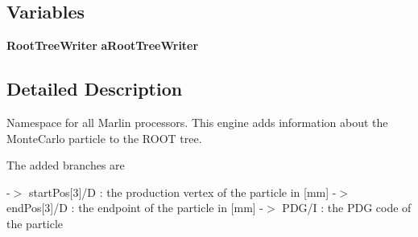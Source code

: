 \subsection*{Variables}
\begin{DoxyCompactItemize}
\item 
{\bf Root\-Tree\-Writer} {\bfseries a\-Root\-Tree\-Writer}\label{namespacemarlin_a9b6fb833e71456793d8aef01d758b027}

\end{DoxyCompactItemize}


\subsection{Detailed Description}
Namespace for all Marlin processors. This engine adds information about the Monte\-Carlo particle to the R\-O\-O\-T tree.

The added branches are

-\/$>$ start\-Pos[3]/\-D \-: the production vertex of the particle in [mm] -\/$>$ end\-Pos[3]/\-D \-: the endpoint of the particle in [mm] -\/$>$ P\-D\-G/\-I \-: the P\-D\-G code of the particle 